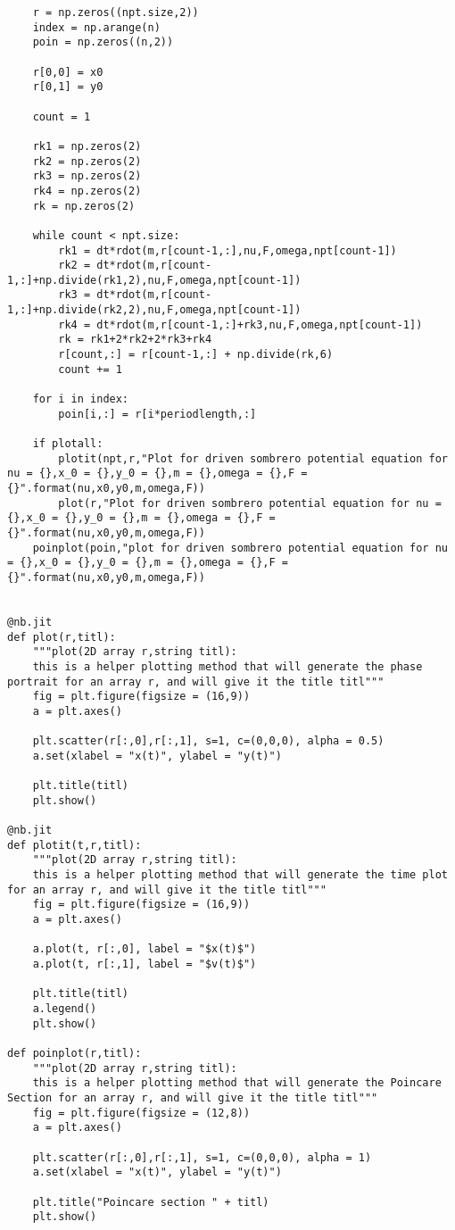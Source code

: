 \documentclass[aps,pra,notitlepage,amsmath,amssymb,letterpaper,12pt]{revtex4-1}
\begin{document}
\begin{lstlisting}
    r = np.zeros((npt.size,2))
    index = np.arange(n)
    poin = np.zeros((n,2))
    
    r[0,0] = x0
    r[0,1] = y0
    
    count = 1
    
    rk1 = np.zeros(2)
    rk2 = np.zeros(2)
    rk3 = np.zeros(2)
    rk4 = np.zeros(2)
    rk = np.zeros(2)
    
    while count < npt.size:
        rk1 = dt*rdot(m,r[count-1,:],nu,F,omega,npt[count-1])
        rk2 = dt*rdot(m,r[count-1,:]+np.divide(rk1,2),nu,F,omega,npt[count-1])
        rk3 = dt*rdot(m,r[count-1,:]+np.divide(rk2,2),nu,F,omega,npt[count-1])
        rk4 = dt*rdot(m,r[count-1,:]+rk3,nu,F,omega,npt[count-1])
        rk = rk1+2*rk2+2*rk3+rk4
        r[count,:] = r[count-1,:] + np.divide(rk,6)
        count += 1
    
    for i in index:
        poin[i,:] = r[i*periodlength,:]
    
    if plotall:
        plotit(npt,r,"Plot for driven sombrero potential equation for nu = {},x_0 = {},y_0 = {},m = {},omega = {},F = {}".format(nu,x0,y0,m,omega,F))
        plot(r,"Plot for driven sombrero potential equation for nu = {},x_0 = {},y_0 = {},m = {},omega = {},F = {}".format(nu,x0,y0,m,omega,F))
    poinplot(poin,"plot for driven sombrero potential equation for nu = {},x_0 = {},y_0 = {},m = {},omega = {},F = {}".format(nu,x0,y0,m,omega,F))

    
@nb.jit
def plot(r,titl):
    """plot(2D array r,string titl):
    this is a helper plotting method that will generate the phase portrait for an array r, and will give it the title titl"""
    fig = plt.figure(figsize = (16,9))
    a = plt.axes()
    
    plt.scatter(r[:,0],r[:,1], s=1, c=(0,0,0), alpha = 0.5)
    a.set(xlabel = "x(t)", ylabel = "y(t)")
    
    plt.title(titl)
    plt.show()
    
@nb.jit
def plotit(t,r,titl):
    """plot(2D array r,string titl):
    this is a helper plotting method that will generate the time plot for an array r, and will give it the title titl"""
    fig = plt.figure(figsize = (16,9))
    a = plt.axes()
 
    a.plot(t, r[:,0], label = "$x(t)$")
    a.plot(t, r[:,1], label = "$v(t)$")
    
    plt.title(titl)
    a.legend()
    plt.show()
    
def poinplot(r,titl):
    """plot(2D array r,string titl):
    this is a helper plotting method that will generate the Poincare Section for an array r, and will give it the title titl"""
    fig = plt.figure(figsize = (12,8))
    a = plt.axes()
    
    plt.scatter(r[:,0],r[:,1], s=1, c=(0,0,0), alpha = 1)
    a.set(xlabel = "x(t)", ylabel = "y(t)")
    
    plt.title("Poincare section " + titl)
    plt.show()

\end{lstlisting}
\end{document}
